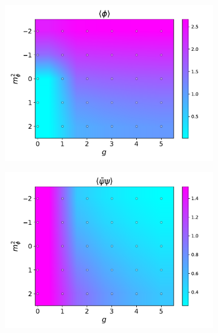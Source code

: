 \begin{figure}[htp]
    \centering
    \begin{subfigure}[b]{0.48\textwidth}
        \includegraphics[width=\textwidth]{figures/phase_diagram/g-m/m_g_phi.pdf}
    \end{subfigure}
    \begin{subfigure}[b]{0.48\textwidth}
        \includegraphics[width=\textwidth]{figures/phase_diagram/g-m/m_g_cond.pdf}
    \end{subfigure}
    \begin{subfigure}[b]{0.48\textwidth}

\end{subfigure}
\end{figure}
